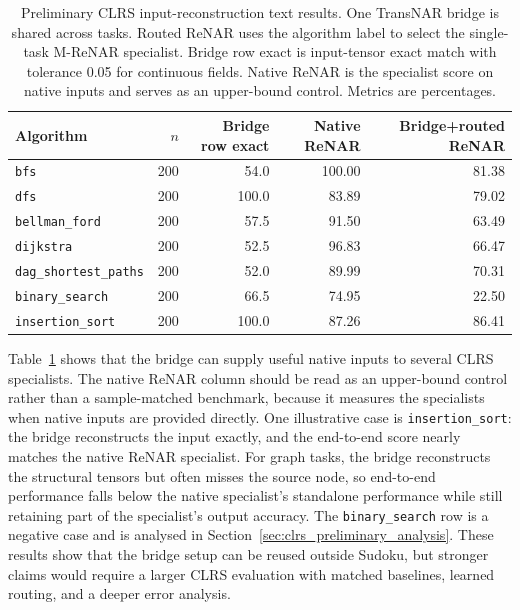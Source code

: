\documentclass[11pt]{article}
\begin{document}
\begin{table}[t]
\centering
\small
\caption{Preliminary CLRS input-reconstruction text results. One TransNAR bridge is shared across tasks. Routed ReNAR uses the algorithm label to select the single-task M-ReNAR specialist. Bridge row exact is input-tensor exact match with tolerance 0.05 for continuous fields. Native ReNAR is the specialist score on native inputs and serves as an upper-bound control. Metrics are percentages.}
\label{tab:clrs_preliminary_results}
\begin{tabular}{lrrrr}
\toprule
Algorithm & $n$ & Bridge row exact & Native ReNAR & Bridge+routed ReNAR \\
\midrule
\texttt{bfs}                  & 200 & 54.0  & 100.00 & 81.38 \\
\texttt{dfs}                  & 200 & 100.0 & 83.89  & 79.02 \\
\texttt{bellman\_ford}        & 200 & 57.5  & 91.50  & 63.49 \\
\texttt{dijkstra}             & 200 & 52.5  & 96.83  & 66.47 \\
\texttt{dag\_shortest\_paths} & 200 & 52.0  & 89.99  & 70.31 \\
\texttt{binary\_search}       & 200 & 66.5  & 74.95  & 22.50 \\
\texttt{insertion\_sort}      & 200 & 100.0 & 87.26  & 86.41 \\
\bottomrule
\end{tabular}
\end{table}

Table~\ref{tab:clrs_preliminary_results} shows that the bridge can supply useful native inputs to several CLRS specialists.
The native ReNAR column should be read as an upper-bound control rather than a sample-matched benchmark, because it measures the specialists when native inputs are provided directly.
One illustrative case is \texttt{insertion\_sort}: the bridge reconstructs the input exactly, and the end-to-end score nearly matches the native ReNAR specialist.
For graph tasks, the bridge reconstructs the structural tensors but often misses the source node, so end-to-end performance falls below the native specialist's standalone performance while still retaining part of the specialist's output accuracy.
The \texttt{binary\_search} row is a negative case and is analysed in Section~\ref{sec:clrs_preliminary_analysis}.
These results show that the bridge setup can be reused outside Sudoku, but stronger claims would require a larger CLRS evaluation with matched baselines, learned routing, and a deeper error analysis.
\end{document}
